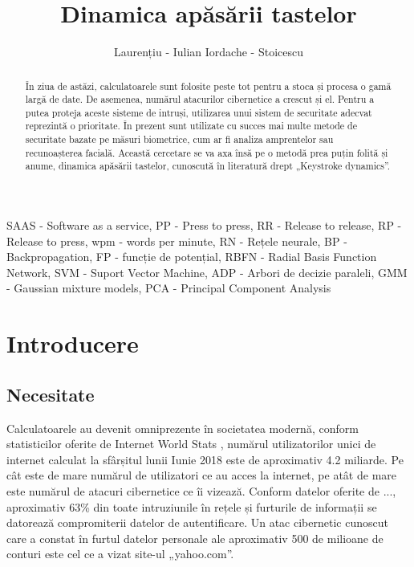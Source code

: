 \documentclass[9pt,shortpaper,twoside,web]{ieeecolor}
\begin{document}
\title{Dinamica apăsării tastelor}
\author{Laurențiu - Iulian Iordache - Stoicescu }

\maketitle


\begin{abstract}
În ziua de astăzi, calculatoarele sunt folosite peste tot pentru a stoca și procesa o gamă largă de date. De asemenea, numărul atacurilor cibernetice a crescut și el. Pentru a putea proteja aceste sisteme de intruși, utilizarea unui sistem de securitate adecvat reprezintă o prioritate. În prezent sunt utilizate cu succes mai multe metode de securitate bazate pe măsuri biometrice, cum ar fi analiza amprentelor sau recunoașterea facială. Această cercetare se va axa însă pe o metodă prea puțin folită și anume, dinamica apăsării tastelor, cunoscută în literatură drept „Keystroke dynamics”.
\end{abstract}

\begin{IEEEkeywords}
SAAS - Software as a service,
PP - Press to press,
RR - Release to release, 
RP - Release to press,
wpm - words per minute,
RN - Rețele neurale, 
BP - Backpropagation, 
FP - funcție de potențial, 
RBFN - Radial Basis Function Network,
SVM - Suport Vector Machine, 
ADP - Arbori de decizie paraleli, 
GMM - Gaussian mixture models, 
PCA - Principal Component Analysis
\end{IEEEkeywords}


\section{Introducere}
\label{sec:introduction}


\subsection{Necesitate}
	Calculatoarele au devenit omniprezente în societatea modernă, conform statisticilor oferite de Internet World Stats \cite{b1}, numărul utilizatorilor unici de internet calculat la sfârșitul lunii Iunie 2018 este de aproximativ 4.2 miliarde. Pe cât este de mare numărul de utilizatori ce au acces la internet, pe atât de mare este numărul de atacuri cibernetice ce îi vizează. Conform datelor oferite de ..., aproximativ 63\% din toate intruziunile în rețele și furturile de informații se datorează compromiterii datelor de autentificare. Un atac cibernetic cunoscut care a constat în furtul datelor personale ale aproximativ 500 de milioane de conturi este cel ce a vizat site-ul „yahoo.com”.
\end{document}
